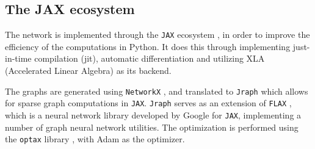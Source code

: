 \subsection{The JAX ecosystem}
The network is implemented through the \verb|JAX| ecosystem \cite{jax2018github}, in order to improve the efficiency of the computations in Python.
It does this through implementing just-in-time compilation (jit), automatic differentiation and utilizing XLA (Accelerated Linear Algebra) as its backend.

The graphs are generated using \verb|NetworkX| \cite{SciPyProceedings_11}, and translated to \verb|Jraph| \cite{jraph2020github} which allows for sparse graph computations in \verb|JAX|.
\verb|Jraph| serves as an extension of \verb|FLAX| \cite{flax2020github}, which is a neural network library developed by Google for \verb|JAX|, implementing a number of graph neural network utilities.
The optimization is performed using the \verb|optax| library \cite{deepmind2020jax}, with Adam as the optimizer.



